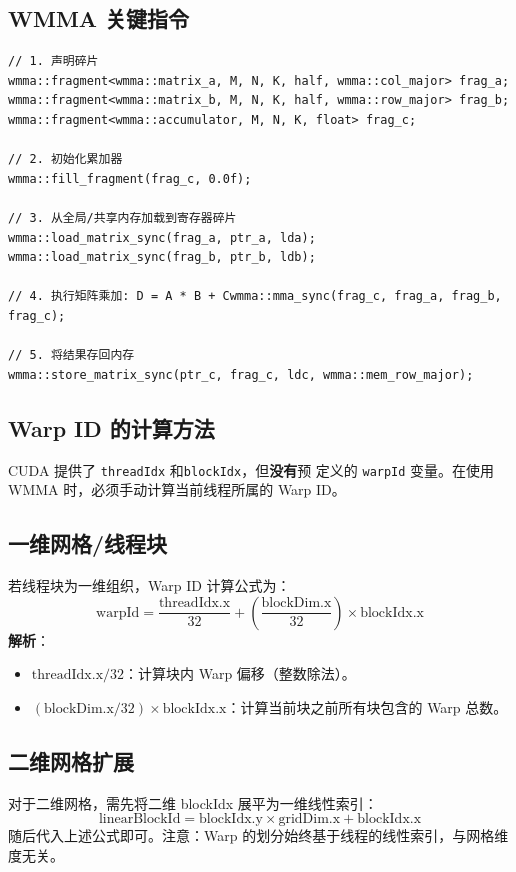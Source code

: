 \subsection{WMMA 关键指令}
\begin{lstlisting}
// 1. 声明碎片
wmma::fragment<wmma::matrix_a, M, N, K, half, wmma::col_major> frag_a;
wmma::fragment<wmma::matrix_b, M, N, K, half, wmma::row_major> frag_b;
wmma::fragment<wmma::accumulator, M, N, K, float> frag_c;

// 2. 初始化累加器
wmma::fill_fragment(frag_c, 0.0f);

// 3. 从全局/共享内存加载到寄存器碎片
wmma::load_matrix_sync(frag_a, ptr_a, lda);
wmma::load_matrix_sync(frag_b, ptr_b, ldb);

// 4. 执行矩阵乘加: D = A * B + Cwmma::mma_sync(frag_c, frag_a, frag_b, frag_c);

// 5. 将结果存回内存
wmma::store_matrix_sync(ptr_c, frag_c, ldc, wmma::mem_row_major);
\end{lstlisting}

\subsection{Warp ID 的计算方法}
CUDA 提供了 \texttt{threadIdx} 和\texttt{blockIdx}，但\textbf{没有}预
定义的 \texttt{warpId} 变量。在使用 WMMA 时，必须手动计算当前线程所属的 Warp ID。

\subsection{一维网格/线程块}
若线程块为一维组织，Warp ID 计算公式为：
\begin{equation}
    \text{warpId} = \frac{\text{threadIdx.x}}{32}
+ \left(\frac{\text{blockDim.x}}{32} \right) \times\text{blockIdx.x}
\end{equation}
\textbf{解析}：
\begin{itemize}
    \item $\text{threadIdx.x} / 32$：计算块内 Warp 偏移（整数除法）。
    \item $(\text{blockDim.x} / 32) \times \text{blockIdx.x}$：计算当前块之前所有块包含的 Warp 总数。
\end{itemize}

\subsection{二维网格扩展}
对于二维网格，需先将二维 blockIdx 展平为一维线性索引：
\begin{equation}
    \text{linearBlockId} = \text{blockIdx.y} \times\text{gridDim.x} + \text{blockIdx.x}
\end{equation}
随后代入上述公式即可。注意：Warp 的划分始终基于线程的线性索引，与网格维度无关。

